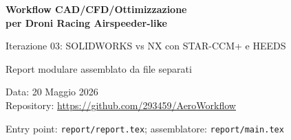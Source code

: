 \documentclass[12pt,a4paper]{report}
\begin{document}
\begin{titlepage}
\centering
\vspace*{2cm}
{\huge\bfseries Workflow CAD/CFD/Ottimizzazione\\[0.4em]
per Droni Racing Airspeeder-like\par}
\vspace{1.2cm}
{\Large Iterazione 03: SOLIDWORKS vs NX con STAR-CCM+ e HEEDS\par}
\vspace{1cm}
{\large Report modulare assemblato da file separati\par}
\vspace{2cm}
{\normalsize Data: 20 Maggio 2026\\
Repository: \url{https://github.com/293459/AeroWorkflow}\par}
\vfill
{\small Entry point: \texttt{report/report.tex}; assemblatore: \texttt{report/main.tex}}
\end{titlepage}

\tableofcontents
\newpage






\printbibliography[title={Riferimenti}]
\end{document}

